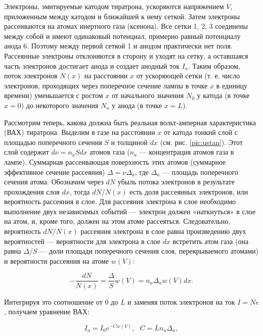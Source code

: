 \documentclass[a4paper,12pt]{article}
\begin{document}
Электроны, эмитируемые катодом тиратрона, ускоряются напряжением $V$, приложенным между катодом и ближайшей к нему сеткой. Затем электроны рассеиваются на атомах инертного газа (ксенона). Все сетки 1, 2, 3 соединены между собой и имеют одинаковый потенциал, примерно равный потенциалу анода 6. Поэтому между первой сеткой 1 и анодом практически нет поля. Рассеянные электроны отклоняются в сторону и уходят на сетку, а оставшаяся часть электронов достигает анода и создает анодный ток $I_a$. Таким образом, поток электронов $N (x)$ на расстоянии $x$ от ускоряющей сетки (т. е. число электронов, проходящих через поперечное сечение лампы в точке $x$ в единицу времени) уменьшается с ростом $x$ от начального значения $N_0$ у катода (в точке $x = 0$) до некоторого значения $N_a$ у анода (в точке $x = L$).

Рассмотрим теперь, какова должна быть реальная вольт-амперная характеристика (ВАХ) тиратрона. Выделим в газе на расстоянии $x$ от катода тонкий слой с площадью поперечного сечения $S$ и толщиной $dx$ (см. рис. \ref{pic:ustan}). Этот слой содержит $d\nu = n_a Sdx$ атомов газа ($n_a$ — концентрация атомов газа в лампе). Суммарная рассеивающая поверхность этих атомов (суммарное эффективное сечение рассеяния) $\Delta = \nu \Delta_a$, где $\Delta_a$ — площадь поперечного сечения атома. Обозначим через $dN$ убыль потока электронов в результате прохождения слоя $dx$, тогда $dN/N (x)$ есть доля рассеянных электронов, или вероятность рассеяния в слое. Для рассеяния электрона в слое необходимо выполнение двух независимых событий — электрон должен «наткнуться» в слое на атом, и, кроме того, должен на этом атоме рассеяться. Следовательно, вероятность $dN/N (x)$ рассеяния электрона в слое равна произведению двух вероятностей — вероятности для электрона в слое $dx$ встретить атом газа (она равна $\Delta/S$ — доли площади поперечного сечения слоя, перекрываемого атомами) и вероятности рассеяния на атоме $w(V)$:

\begin{equation}\label{eq:12}
    - \frac{dN}{N(x)} = \frac{\Delta}{S} w(V) = n_a \Delta_a w(V) dx.
\end{equation}

Интегрируя это соотношение от 0 до $L$ и заменяя поток электронов на ток $I = N e$, получаем уравнение ВАХ:

\begin{equation}\label{eq:13}
    I_a = I_0 e^{- C w(V)}, \ \ \ C = L n_a \Delta_a,
\end{equation}
\end{document}
